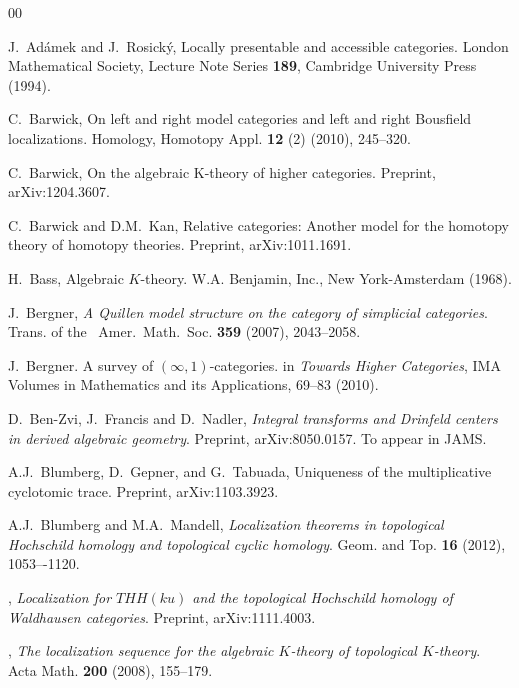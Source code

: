 \documentclass{amsart}
\numberwithin{equation}{section}
\theoremstyle{definition}
\begin{document}
\begin{thebibliography}{00}

 J.~Ad\'{a}mek and J.~Rosick\'{y},
\newblock Locally presentable and accessible categories.
\newblock London Mathematical Society, Lecture Note Series {\bf 189},
Cambridge University Press (1994).

 C.~Barwick,
\newblock On left and right model categories and left and right
{B}ousfield localizations.
\newblock Homology, Homotopy Appl. {\bf 12} (2) (2010), 245--320.

 C.~Barwick,
\newblock On the algebraic {K}-theory of higher categories.
\newblock Preprint, arXiv:1204.3607.

 C.~Barwick and D.M.~Kan,
\newblock Relative categories: Another model for the homotopy theory
of homotopy theories.
\newblock Preprint, arXiv:1011.1691.

 H.~Bass,
\newblock Algebraic {$K$}-theory.
\newblock W.A. Benjamin, Inc., New York-Amsterdam (1968).

 J.~Bergner, {\em A {Q}uillen model structure on the
category of simplicial categories}.  Trans. of the ~Amer.~Math.~Soc. {\bf 359}
(2007), 2043--2058.

 J.~Bergner.
\newblock A survey of $(\infty,1)$-categories.
\newblock in {\em Towards Higher Categories}, IMA Volumes in
Mathematics and its Applications, 69--83 (2010).

 D.~Ben-Zvi, J.~Francis and D.~Nadler, {\em Integral
transforms and {D}rinfeld centers in derived algebraic geometry}.
Preprint, arXiv:8050.0157. To appear in JAMS.

 A.J.~Blumberg, D.~Gepner, and G.~Tabuada,
\newblock Uniqueness of the multiplicative cyclotomic trace.
\newblock Preprint, arXiv:1103.3923.

 A.J.~Blumberg and M.A.~Mandell, {\em Localization theorems in
topological {H}ochschild homology and topological cyclic
homology}.  Geom. and Top. {\bf 16} (2012), 1053–-1120.

 \bysame, {\em Localization for
  $THH(ku)$ and the topological Hochschild homology of {W}aldhausen
  categories}.  Preprint, arXiv:1111.4003.

 \bysame, {\em The localization
  sequence for the algebraic $K$-theory of topological $K$-theory}.
  Acta Math. {\bf 200} (2008), 155--179.


\end{thebibliography}
\end{document}
